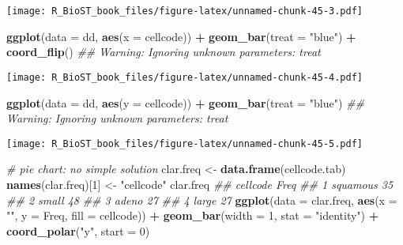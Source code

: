 \documentclass[
]{book}
\newenvironment{Shaded}{\begin{snugshade}}{\end{snugshade}}
\newcommand{\CommentTok}[1]{\textcolor[rgb]{0.56,0.35,0.01}{\textit{#1}}}
\newcommand{\DataTypeTok}[1]{\textcolor[rgb]{0.13,0.29,0.53}{#1}}
\newcommand{\DecValTok}[1]{\textcolor[rgb]{0.00,0.00,0.81}{#1}}
\newcommand{\KeywordTok}[1]{\textcolor[rgb]{0.13,0.29,0.53}{\textbf{#1}}}
\newcommand{\NormalTok}[1]{#1}
\newcommand{\OperatorTok}[1]{\textcolor[rgb]{0.81,0.36,0.00}{\textbf{#1}}}
\newcommand{\StringTok}[1]{\textcolor[rgb]{0.31,0.60,0.02}{#1}}
\begin{document}
\texttt{[image: R\_BioST\_book\_files/figure-latex/unnamed-chunk-45-3.pdf]}

\begin{Shaded}
\begin{Highlighting}[]
\KeywordTok{ggplot}\NormalTok{(}\DataTypeTok{data =}\NormalTok{ dd, }\KeywordTok{aes}\NormalTok{(}\DataTypeTok{x =}\NormalTok{ cellcode)) }\OperatorTok{+}
\StringTok{  }\KeywordTok{geom\_bar}\NormalTok{(}\DataTypeTok{treat =} \StringTok{"blue"}\NormalTok{) }\OperatorTok{+}\StringTok{ }
\StringTok{  }\KeywordTok{coord\_flip}\NormalTok{()}
\CommentTok{\#\# Warning: Ignoring unknown parameters: treat}
\end{Highlighting}
\end{Shaded}

\texttt{[image: R\_BioST\_book\_files/figure-latex/unnamed-chunk-45-4.pdf]}

\begin{Shaded}
\begin{Highlighting}[]
\KeywordTok{ggplot}\NormalTok{(}\DataTypeTok{data =}\NormalTok{ dd, }\KeywordTok{aes}\NormalTok{(}\DataTypeTok{y =}\NormalTok{ cellcode)) }\OperatorTok{+}
\StringTok{  }\KeywordTok{geom\_bar}\NormalTok{(}\DataTypeTok{treat =} \StringTok{"blue"}\NormalTok{) }
\CommentTok{\#\# Warning: Ignoring unknown parameters: treat}
\end{Highlighting}
\end{Shaded}

\texttt{[image: R\_BioST\_book\_files/figure-latex/unnamed-chunk-45-5.pdf]}

\begin{Shaded}
\begin{Highlighting}[]
\CommentTok{\# pie chart: no simple solution}
\NormalTok{clar.freq \textless{}{-}}\StringTok{ }\KeywordTok{data.frame}\NormalTok{(cellcode.tab)}
\KeywordTok{names}\NormalTok{(clar.freq)[}\DecValTok{1}\NormalTok{] \textless{}{-}}\StringTok{ "cellcode"}
\NormalTok{clar.freq}
\CommentTok{\#\#   cellcode Freq}
\CommentTok{\#\# 1 squamous   35}
\CommentTok{\#\# 2    small   48}
\CommentTok{\#\# 3    adeno   27}
\CommentTok{\#\# 4    large   27}
\KeywordTok{ggplot}\NormalTok{(}\DataTypeTok{data =}\NormalTok{ clar.freq, }\KeywordTok{aes}\NormalTok{(}\DataTypeTok{x =} \StringTok{""}\NormalTok{, }\DataTypeTok{y =}\NormalTok{ Freq, }\DataTypeTok{fill =}\NormalTok{ cellcode)) }\OperatorTok{+}
\StringTok{  }\KeywordTok{geom\_bar}\NormalTok{(}\DataTypeTok{width =} \DecValTok{1}\NormalTok{, }\DataTypeTok{stat =} \StringTok{"identity"}\NormalTok{) }\OperatorTok{+}\StringTok{ }
\StringTok{  }\KeywordTok{coord\_polar}\NormalTok{(}\StringTok{"y"}\NormalTok{, }\DataTypeTok{start =} \DecValTok{0}\NormalTok{)}
\end{Highlighting}
\end{Shaded}
\end{document}
